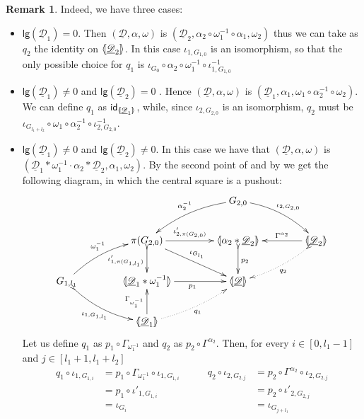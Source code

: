\documentclass[a4paper]{article}
\newcommand{\id}[1]{\mathsf{id}_{#1}}
\newcommand{\dder}[1]{\mathscr{#1}}
\newcommand{\der}[1]{\underline{\dder{#1}}}
\newcommand{\lpro}{\langle \hspace{-1.85pt}[}
\newcommand{\rpro}{]\hspace{-1.85pt}\rangle}
\newcommand{\tpro}[1]{\lpro \der{#1}\rpro}
\newcommand{\tproi}[2]{\lpro \der{#1}_{#2}\rpro}
\newcommand{\lgh}[0]{\mathsf{lg}}
\theoremstyle{definition}
\newtheorem{remark}[theorem]{Remark}
\begin{document}
\begin{remark}
	Indeed, we have three cases:
	\begin{itemize}
		\item $\lgh(\der{D}_1)=0$. Then  $(\der{D}, \alpha, \omega)$ is $(\der{D}_2, \alpha_2\circ \omega_1^{-1}\circ \alpha_1, \omega_2)$ thus we can take as $q_2$ the identity on $\lpro \der{D}_2\rpro$. In this case $\iota_{1,G_{1,0}}$ is an isomorphism, so that the only possible choice for $q_1$ is $\iota_{G_0}\circ \alpha_2\circ \omega^{-1}_1 \circ \iota^{-1}_{1,G_{1,0}}$
		\item $\lgh(\der{D}_1)\neq 0$ and $\lgh(\der{D}_2)=0$ . Hence  $(\der{D}, \alpha, \omega)$ is $(\der{D}_1, \alpha_1, \omega_1 \circ \alpha^{-1}_2\circ \omega_2)$. We can define $q_1$ as $\id{\lpro \der{D}_1\rpro}$, while, since $\iota_{2,G_{2,0}}$ is an isomorphism, $q_2$ must be  $\iota_{G_{l_1+l_2}}\circ  \omega_1  \circ \alpha^{-1}_2 \circ \iota^{-1}_{2,G_{2,0}}$.
		\item  $\lgh(\der{D}_1)\neq 0$ and $\lgh(\der{D}_2)\neq 0$. In this case we have that $(\der{D}, \alpha, \omega)$  is $(\der{D}_1*\omega_1^{-1}\cdot \alpha_2*\der{D}_2, \alpha_1, \omega_2)$. By the second point of  and by  we get the following diagram, in which the central square is a pushout:
			\[\xymatrix@C=40pt{&&G_{2,0}  \ar@/_.3cm/[dl]_{\alpha^{-1}_2} \ar@/^.3cm/[dr]^{\iota_{2, G_{2,0}}}\\&\pi(G_{2,0}) \ar[dr]^{\iota_{G_{l_1}}}\ar[r]^-{\iota'_{2, \pi(G_{2,0})}} \ar@{>->}[d]_-{\iota'_{1, \pi(G_{1,l_1})}} & \lpro \alpha_2*\der{D}_2 \rpro \ar@{>->}[d]^{p_2} &\tproi{D}{2} \ar[l]_-{\Gamma^{\alpha_2}} \ar@{>.>}@/^.2cm/[dl]^{q_2}\\ G_{1,l_1}  \ar@/^.3cm/[ur]^{\omega^{-1}_1}  \ar@{>->}@/_.3cm/[dr]_{\iota_{1, G_{1, l_1}}}& \lpro \der{D}_1*\omega_1^{-1} \rpro  \ar[r]_{p_1}& \tpro{D} \\ &\tproi{D}{1} \ar[u]^{\Gamma_{\omega^{-1}_1}}  \ar@{.>}@/_.2cm/[ur]_{q_1}}\]
			Let us define $q_1$ as $p_1\circ \Gamma_{\omega^{-1}_1}$ and $q_2$ as $p_2\circ \Gamma^{\alpha_2}$. Then, for every $i\in [0,l_1-1]$ and $j\in [l_1+1, l_1+l_2]$
				\[\begin{split}
		q_1\circ \iota_{1, G_{1,i}}&=p_1\circ \Gamma_{\omega^{-1}_1}\circ \iota_{1, G_{1,i}}\\&=p_1\circ \iota'_{1, G_{1,i}} \\&=\iota_{G_{i}}
		\end{split} \qquad \begin{split}
			q_2\circ \iota_{2, G_{2,j}}&=p_2\circ \Gamma^{\alpha_2}\circ \iota_{2, G_{2,j}}\\&=p_2\circ \iota'_{2, G_{2,j}} \\&=\iota_{G_{j+l_1}}

\end{split}\]
\end{itemize}
\end{remark}
\end{document}
